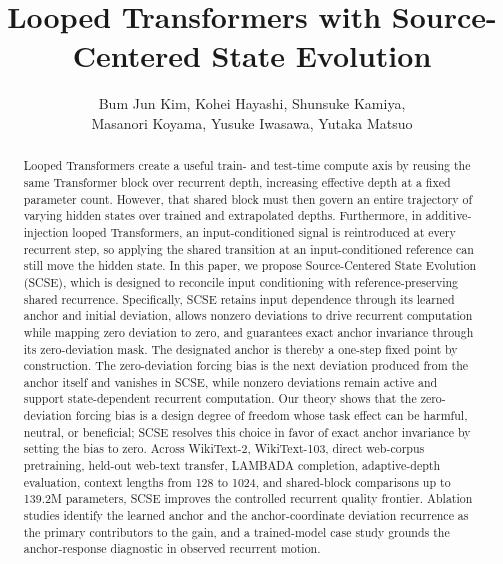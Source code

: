 \documentclass[letterpaper]{article} %
\title{Looped Transformers with Source-Centered State Evolution}
\author{
	Bum Jun Kim\corresponding,
	Kohei Hayashi,
	Shunsuke Kamiya,\\
	Masanori Koyama,
	Yusuke Iwasawa,
	Yutaka Matsuo
}
\newcommand{\SCSE}{\textsc{SCSE}}
\theoremstyle{remark}
\begin{document}
\maketitle

\begin{abstract}
	Looped Transformers create a useful train- and test-time compute axis by reusing the same Transformer block over recurrent depth, increasing effective depth at a fixed parameter count.  However, that shared block must then govern an entire trajectory of varying hidden states over trained and extrapolated depths.  Furthermore, in additive-injection looped Transformers, an input-conditioned signal is reintroduced at every recurrent step, so applying the shared transition at an input-conditioned reference can still move the hidden state.  In this paper, we propose Source-Centered State Evolution (\SCSE{}), which is designed to reconcile input conditioning with reference-preserving shared recurrence.  Specifically, \SCSE{} retains input dependence through its learned anchor and initial deviation, allows nonzero deviations to drive recurrent computation while mapping zero deviation to zero, and guarantees exact anchor invariance through its zero-deviation mask.  The designated anchor is thereby a one-step fixed point by construction.  The zero-deviation forcing bias is the next deviation produced from the anchor itself and vanishes in \SCSE{}, while nonzero deviations remain active and support state-dependent recurrent computation.  Our theory shows that the zero-deviation forcing bias is a design degree of freedom whose task effect can be harmful, neutral, or beneficial; \SCSE{} resolves this choice in favor of exact anchor invariance by setting the bias to zero.  Across WikiText-2, WikiText-103, direct web-corpus pretraining, held-out web-text transfer, LAMBADA completion, adaptive-depth evaluation, context lengths from 128 to 1024, and shared-block comparisons up to 139.2M parameters, \SCSE{} improves the controlled recurrent quality frontier.  Ablation studies identify the learned anchor and the anchor-coordinate deviation recurrence as the primary contributors to the gain, and a trained-model case study grounds the anchor-response diagnostic in observed recurrent motion.
\end{abstract}
\end{document}
